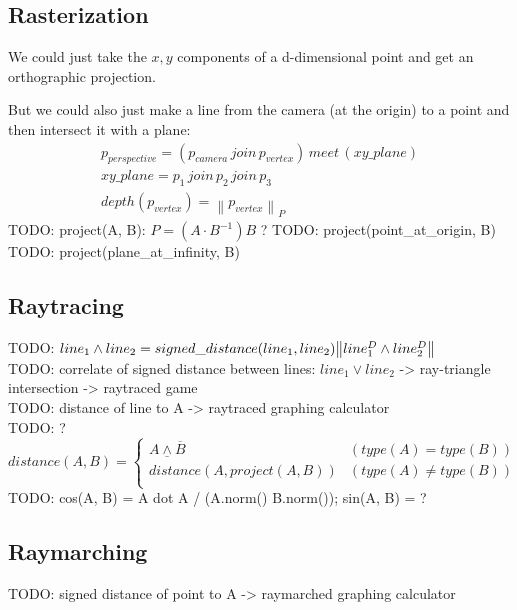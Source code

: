 \documentclass[twoside]{article}
\newcommand{\M}[1]{\scriptstyle{#1}} %
\newcommand{\join}{{\,\M{join}\,}}
\newcommand{\meet}{{\,\M{meet}\,}}
\newcommand{\norm}[1]{{\left\lVert{#1}\right\rVert}}
\begin{document}
\begin{multicols*}{2}
            \subsection{Rasterization}
            \par
                We could just take the $ x,y $ components of a d-dimensional point and get an orthographic projection.
            \par
                But we could also just make a line from the camera (at the origin) to a point and then intersect it with a plane:
                \begin{gather*}
                    p_{perspective} = (p_{camera} \join p_{vertex}) \meet (xy\_plane) \\
                    xy\_plane = p_1 \join p_2 \join p_3 \\
                    depth(p_{vertex}) = \norm{p_{vertex}}_P
                \end{gather*}
                TODO: project(A, B): $ P = (A \cdot B^{-1}) B $ ? %
                TODO: project(point\_at\_origin, B)
                TODO: project(plane\_at\_infinity, B)
            \subsection{Raytracing}
                \par
                    TODO: $ line_1 \wedge line_2 \\= signed\_distance(line_1, line_2) \norm{line_1^D \wedge line_2^D} $ \\
                    TODO: correlate of signed distance between lines: $ line_1 \vee line_2 $ -> ray-triangle intersection -> raytraced game \\
                    TODO: distance of line to A -> raytraced graphing calculator \\
                    TODO: ?
                    $$ distance(A, B) = \begin{cases}
                        \underline{A \wedge \overline{B}} & (type(A) = type(B)) \\
                        distance(A, project(A, B)) & (type(A) \ne type(B)) \\
                    \end{cases} $$
                    TODO: cos(A, B) = A dot A / (A.norm() B.norm()); sin(A, B) = ?
            \subsection{Raymarching}
                    TODO: signed distance of point to A -> raymarched graphing calculator \\

\end{multicols*}
\end{document}
